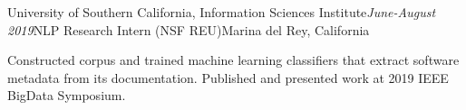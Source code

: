 \begin{rSubsection}{University of Southern California, Information Sciences Institute}{\em June-August 2019}{NLP Research Intern (NSF REU)}{Marina del Rey, California} 
\item Constructed corpus and trained machine learning classifiers that extract software metadata from its documentation. Published and presented work at 2019 IEEE BigData Symposium.
\end{rSubsection}